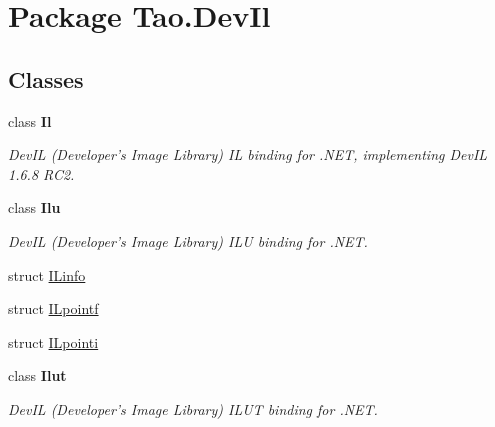 \hypertarget{namespace_tao_1_1_dev_il}{
\section{Package Tao.DevIl}
\label{namespace_tao_1_1_dev_il}
}
\subsection*{Classes}
\begin{DoxyCompactItemize}
\item 
class {\bfseries Il}
\begin{DoxyCompactList}\small\item\em DevIL (Developer's Image Library) IL binding for .NET, implementing DevIL 1.6.8 RC2. \item\end{DoxyCompactList}\item 
class {\bfseries Ilu}
\begin{DoxyCompactList}\small\item\em DevIL (Developer's Image Library) ILU binding for .NET. \item\end{DoxyCompactList}\item 
struct \hyperlink{struct_tao_1_1_dev_il_1_1_i_linfo}{ILinfo}
\item 
struct \hyperlink{struct_tao_1_1_dev_il_1_1_i_lpointf}{ILpointf}
\item 
struct \hyperlink{struct_tao_1_1_dev_il_1_1_i_lpointi}{ILpointi}
\item 
class {\bfseries Ilut}
\begin{DoxyCompactList}\small\item\em DevIL (Developer's Image Library) ILUT binding for .NET. \item\end{DoxyCompactList}\end{DoxyCompactItemize}
